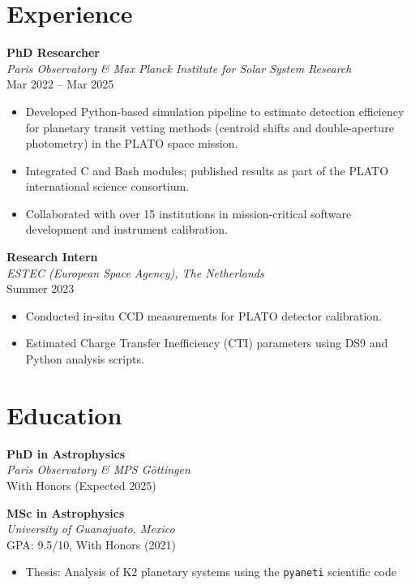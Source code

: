 \documentclass[10pt,a4paper]{article}
\begin{document}
\section*{Experience}

\textbf{PhD Researcher} \\
\textit{Paris Observatory \& Max Planck Institute for Solar System Research} \\
Mar 2022 -- Mar 2025
\begin{itemize}[leftmargin=1.5em]
    \item Developed Python-based simulation pipeline to estimate detection efficiency for planetary transit vetting methods (centroid shifts and double-aperture photometry) in the PLATO space mission.
    \item Integrated C and Bash modules; published results as part of the PLATO international science consortium.
    \item Collaborated with over 15 institutions in mission-critical software development and instrument calibration.
\end{itemize}

\textbf{Research Intern} \\
\textit{ESTEC (European Space Agency), The Netherlands} \\
Summer 2023
\begin{itemize}[leftmargin=1.5em]
    \item Conducted in-situ CCD measurements for PLATO detector calibration.
    \item Estimated Charge Transfer Inefficiency (CTI) parameters using DS9 and Python analysis scripts.
\end{itemize}

\section*{Education}

\textbf{PhD in Astrophysics} \\
\textit{Paris Observatory \& MPS Göttingen} \\
With Honors (Expected 2025)

\vspace{0.5em}

\textbf{MSc in Astrophysics} \\
\textit{University of Guanajuato, Mexico} \\
GPA: 9.5/10, With Honors (2021)

\begin{itemize}[leftmargin=1.5em]
    \item Thesis: Analysis of K2 planetary systems using the \texttt{pyaneti} scientific code
\end{itemize}
\end{document}
